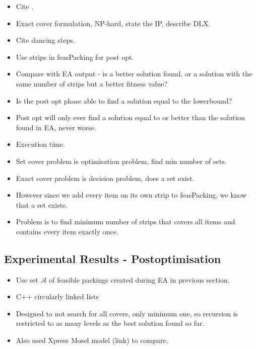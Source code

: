 \documentclass[authoryear]{elsarticle}
\begin{document}
{\color{myGreen}
\begin{itemize}[leftmargin=*]
	\item Cite \citet{malaguti2008}.
	\item Exact cover formulation, NP-hard, state the IP, describe DLX.
	\item Cite \citet{knuth2000} dancing steps.
	\item Use strips in feasPacking for post opt.
	\item Compare with EA output - is a better solution found, or a solution with the same number of strips but a better fitness value?
	\item Is the post opt phase able to find a solution equal to the lowerbound?
	\item Post opt will only ever find a solution equal to or better than the solution found in EA, never worse.
	\item Execution time.
	\item Set cover problem is optimisation problem, find min number of sets.
	\item Exact cover problem is decision problem, does a set exist.
	\item However since we add every item on its own strip to feasPacking, we know that a set exists.
	\item Problem is to find minimum number of strips that covers all items and contains every item exactly once.
\end{itemize}
}

\subsection{Experimental Results - Postoptimisation}
\label{sub:exppostopt}
{\color{myGreen}
\begin{itemize}[leftmargin=*]
	\item Use set $\mathcal{A}$ of feasible packings created during EA in previous section.
	\item C++ circularly linked lists
	\item Designed to not search for all covers, only minimum one, so recursion is restricted to as many levels as the best solution found so far.
	\item Also used Xpress Mosel model (link) to compare.
\end{itemize}
}
\end{document}

